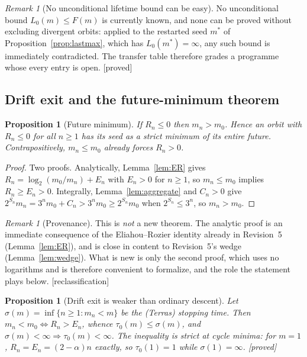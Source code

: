 \documentclass[11pt]{article}
\theoremstyle{plain}
\newtheorem{proposition}[theorem]{Proposition}
\theoremstyle{definition}
\theoremstyle{remark}
\newtheorem{remark}[theorem]{Remark}
\newcommand{\al}{\alpha}
\newcommand{\status}[1]{\textsf{\footnotesize[#1]}}
\begin{document}
\begin{remark}[No unconditional lifetime bound can be easy]\label{sec:nounconditional}
No unconditional bound $L_0(m)\le F(m)$ is currently known, and none can be proved without
excluding divergent orbits: applied to the restarted seed $m^*$ of
Proposition~\ref{prop:lastmax}, which has $L_0(m^*)=\infty$, any such bound is immediately
contradicted. The transfer table therefore grades a programme whose every entry is open.
\status{proved}
\end{remark}

\subsection{Drift exit and the future-minimum theorem}\label{sec:driftexit}

\begin{proposition}[Future minimum]\label{prop:futuremin}
If $R_n\le0$ then $m_n>m_0$. Hence an orbit with $R_n\le0$ for all $n\ge1$ has its seed as a
\emph{strict minimum of its entire future}. Contrapositively, $m_n\le m_0$ already forces
$R_n>0$.
\end{proposition}

\begin{proof}
Two proofs. Analytically, Lemma~\ref{lem:ER} gives $R_n=\log_2(m_0/m_n)+E_n$ with $E_n>0$ for
$n\ge1$, so $m_n\le m_0$ implies $R_n\ge E_n>0$. Integrally, Lemma~\ref{lem:aggregate} and
$C_n>0$ give $2^{S_n}m_n=3^nm_0+C_n>3^nm_0\ge2^{S_n}m_0$ when $2^{S_n}\le3^n$, so $m_n>m_0$.
\end{proof}

\begin{remark}[Provenance]
This is \emph{not} a new theorem. The analytic proof is an immediate consequence of the
Eliahou--Rozier identity already in Revision~5 (Lemma~\ref{lem:ER}), and is close in content to
Revision~5's wedge (Lemma~\ref{lem:wedge}). What is new is only the second proof, which uses no
logarithms and is therefore convenient to formalize, and the role the statement plays below.
\status{reclassification}
\end{remark}

\begin{proposition}[Drift exit is weaker than ordinary descent]\label{prop:weaker}
Let $\sigma(m)=\inf\{n\ge1:m_n<m\}$ be the (Terras) stopping time. Then $m_n<m_0\iff R_n>E_n$,
whence $\tau_0(m)\le\sigma(m)$, and $\sigma(m)<\infty\Rightarrow\tau_0(m)<\infty$. The inequality
is strict at cycle minima: for $m=1$, $R_n=E_n=(2-\al)n$ exactly, so $\tau_0(1)=1$ while
$\sigma(1)=\infty$. \status{proved}
\end{proposition}
\end{document}
